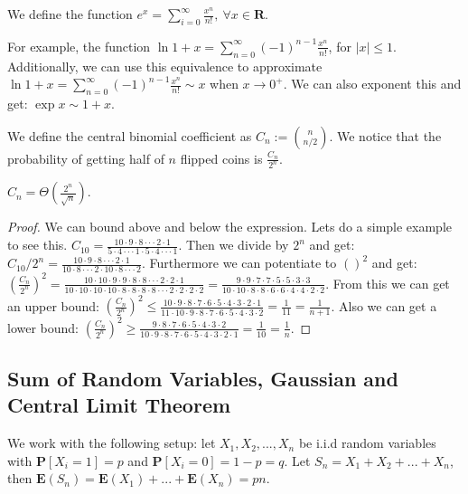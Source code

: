 \begin{definition}[$e^x$]
    We define the function $e^x= \sum_{i=0}^{\infty} \frac{x^{n}}{n!},~ \forall x \in \mathbf{R}$.
\end{definition}

For example, the function $\ln{1+x} = \sum_{n=0}^{\infty} (-1)^{n-1} \frac{x^n}{n!}$, for $|x|\leq 1$. Additionally, we can use this equivalence to approximate $\ln{1+x}= \sum_{n=0}^{\infty} (-1)^{n-1} \frac{x^n}{n!} \sim x$ when $x \rightarrow 0^+$. We can also exponent this and get: $\exp{x} \sim 1+x$.



\begin{definition}
    We define the central binomial coefficient as $C_n:= \binom{n}{n/2}$. We notice that the probability of getting half of $n$ flipped coins is $\frac{C_n}{2^n}$.
\end{definition}

\begin{proposition}
    $C_n= \Theta(\frac{2^n}{\sqrt{n}}).$
\end{proposition}
\begin{proof}
We can bound above and below the expression. Lets do a simple example to see this. $C_{10} = \frac{10\cdot 9\cdot 8\cdot\cdot\cdot2\cdot1}{5\cdot4\cdot\cdot\cdot1\cdot5\cdot4\cdot\cdot\cdot1}$. Then we divide by $2^n$ and get: $C_{10}/2^n = \frac{10\cdot 9\cdot 8\cdot\cdot\cdot2\cdot1}{10\cdot8\cdot\cdot\cdot2\cdot10\cdot8\cdot\cdot\cdot2}.$ Furthermore we can potentiate to $()^2$ and get: $(\frac{C_n}{2^n})^2 = \frac{10\cdot10\cdot 9\cdot9\cdot8\cdot8\cdot\cdot\cdot2\cdot2\cdot1}{10\cdot10\cdot10\cdot10\cdot8\cdot8\cdot8\cdot8\cdot\cdot\cdot2\cdot2\cdot2\cdot2}= \frac{ 9\cdot9\cdot7\cdot7\cdot5\cdot5\cdot3\cdot3}{10\cdot10\cdot8\cdot8\cdot6\cdot6\cdot4\cdot4\cdot2\cdot2}$. From this we can get an upper bound: $(\frac{C_n}{2^n})^2 \leq \frac{10\cdot9 \cdot 8\cdot7\cdot 6 \cdot 5\cdot4 \cdot3 \cdot2 \cdot 1 }{11\cdot10\cdot 9 \cdot 8 \cdot 7\cdot6 \cdot 5\cdot4 \cdot 3 \cdot2  } = \frac{1}{11} = \frac{1}{n+1}$. Also we can get a lower bound:  $(\frac{C_n}{2^n})^2 \geq \frac{ 9\cdot 8 \cdot7\cdot6\cdot5\cdot4\cdot3\cdot2 }{ 10 \cdot 9\cdot 8\cdot7\cdot6\cdot5\cdot4\cdot3\cdot2\cdot1 } = \frac{1}{10} = \frac{1}{n}$.  
\end{proof}



\newpage %

\subsection{Sum of Random Variables, Gaussian and Central Limit Theorem}

We work with the following setup: let $X_1,X_2,...,X_n$ be i.i.d random variables with $\mathbf{P}[X_i = 1]=p$ and $\mathbf{P}[X_i = 0]= 1-p=q$. Let $S_n = X_1+X_2+...+X_n$, then $\mathbf{E}(S_n) = \mathbf{E}(X_1) + ...+\mathbf{E}(X_n) = pn.$


\newpage
